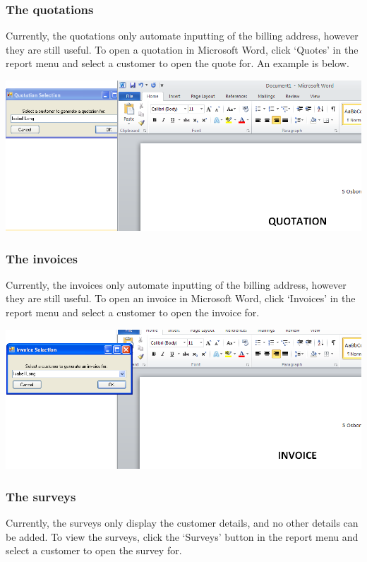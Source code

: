 		\subsubsection{The quotations}
		
		Currently, the quotations only automate inputting of the billing address, however they are still useful.  To open a quotation in Microsoft Word, click `Quotes' in the report menu and select a customer to open the quote for.  An example is below.
		
		\includegraphics[scale=0.5]{quote-IL-select-word_scrot}
		
		\subsubsection{The invoices}
		
		Currently, the invoices only automate inputting of the billing address, however they are still useful.  To open an invoice in Microsoft Word, click `Invoices' in the report menu and select a customer to open the invoice for.
		
		\includegraphics[scale=0.5]{invoice-IL-select-word_scrot}
		
		\subsubsection{The surveys}
		
		Currently, the surveys only display the customer details, and no other details can be added.  To view the surveys, click the `Surveys' button in the report menu and select a customer to open the survey for.

